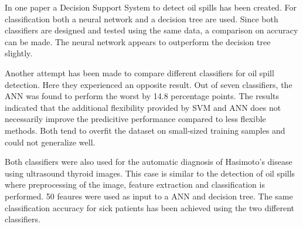 \begin{itemize}
	
	In one paper a Decision Support System to detect oil spills has been created. For classification both a neural network and a decision tree are used. Since both classifiers are designed and tested using the same data, a comparison on accuracy can be made. The neural network appears to outperform the decision tree slightly. \cite{Mera201472}
	
	Another attempt has been made to compare different classifiers for oil spill detection.\cite{Xu201414} Here they experienced an opposite result. Out of seven classifiers, the ANN was found to perform the worst by 14.8 percentage points. The results indicated that the additional flexibility provided by SVM and ANN does not necessarily improve the predicitive performance compared to less flexible methods. Both tend to overfit the dataset on small-sized training samples and could not generalize well.
	
	Both classifiers were also used for the automatic diagnosis of Hasimoto's disease using ultrasound thyroid images\cite{Omiotek201340}. This case is similar to the detection of oil spills where preprocessing of the image, feature extraction and classification is performed. 50 feaures were used as input to a ANN and decision tree. The same classification accuracy for sick patients has been achieved using the two different classifiers.
    

\end{itemize}



	